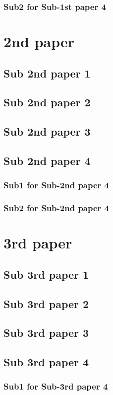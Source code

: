 \documentclass[12pt,a4paper]{report}
\begin{document}
\subsection{Sub2  for Sub-1st paper 4}
\chapter{2nd paper}
\noindent{\rule{\textwidth}{1.5pt}}
\section{Sub 2nd paper 1}
\section{Sub 2nd paper 2}
\section{Sub 2nd paper 3}
\section{Sub 2nd paper 4}
\subsection{Sub1  for Sub-2nd paper 4}
\subsection{Sub2  for Sub-2nd paper 4}
\chapter{3rd paper}
\noindent{\rule{\textwidth}{1.5pt}}
\section{Sub 3rd paper 1}
\section{Sub 3rd paper 2}
\section{Sub 3rd paper 3}
\section{Sub 3rd paper 4}
\subsection{Sub1  for Sub-3rd paper 4}
\end{document}
